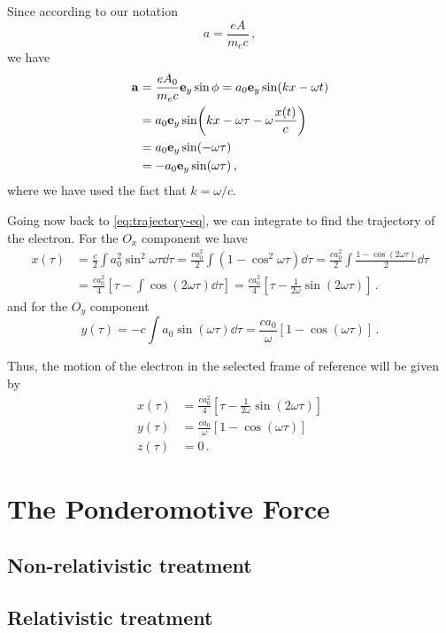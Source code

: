 \documentclass[12pt, class=report, crop=false]{standalone}
\begin{document}
Since according to our notation
\[
a=\frac{e A}{m_e c}\,,
\]
we have
\[
\begin{aligned}
  \vb{a} &= \frac{e A_0}{m_e c}\vb{e}_y\sin{\phi} =
  a_0 \vb{e}_y \sin(kx -\omega t)\\ &=
  a_0 \vb{e}_y \sin(kx - \omega\tau - \omega\frac{x(t)}{c}) \\ &=
  a_0 \vb{e}_y \sin(-\omega \tau) \\ &=
 -a_0 \vb{e}_y \sin(\omega\tau)\,,
\end{aligned}
\]
where we have used the fact that \(k=\omega/c\).

Going now back to \cref{eq:trajectory-eq}, we can integrate to find the trajectory
of the electron. For the \(O_x\) component we have
\[
\begin{aligned}
  x(\tau) &= \frac{c}{2}\int a_0^2 \sin^2 \omega\tau \dd{\tau} =
  \frac{c a_0^2}{2}\int \left(1-\cos^2\omega\tau\right)\dd{\tau} =
  \frac{c a_0^2}{2}\int \frac{1-\cos(2\omega\tau)}{2}\dd{\tau} \\&=
  \frac{c a_0^2}{4}\left[\tau - \int \cos(2\omega\tau)\dd{\tau}\right] =
  \frac{c a_0^2}{4}\left[\tau - \frac{1}{2\omega}\sin(2\omega\tau)\right]\,.
\end{aligned}
\]
and for the \(O_y\) component
\[
y(\tau) = -c \int a_0 \sin(\omega\tau)\dd{\tau} = \frac{c a_0}{\omega}
\left[1 - \cos(\omega\tau)\right]\,.
\]

Thus, the motion of the electron in the selected frame of reference will be
given by
\[
\begin{aligned}
  x(\tau) &= \frac{c a_0^2}{4}\left[\tau - \frac{1}{2\omega}\sin(2\omega\tau)\right]\\
  y(\tau) &= \frac{c a_0}{\omega} \left[1 - \cos(\omega\tau)\right]\\
  z(\tau) &= 0\,.
\end{aligned}
\]

\section{The Ponderomotive Force}

\subsection{Non-relativistic treatment}

\subsection{Relativistic treatment}
\end{document}

